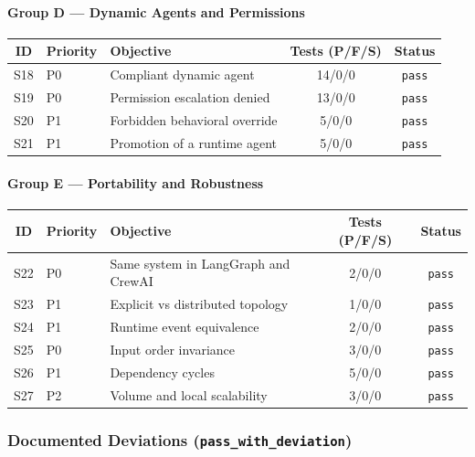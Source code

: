 \documentclass[10pt]{article}
\newcommand{\statuspass}{\textcolor{passgreen}{\texttt{pass}}}
\begin{document}
\paragraph{Group D --- Dynamic Agents and Permissions}

\begin{table}[htbp]
	\centering
	\small
	\begin{tabular}{@{}clp{6.5cm}cc@{}}
		\toprule
		\textbf{ID} & \textbf{Priority} & \textbf{Objective} & \textbf{Tests (P/F/S)} & \textbf{Status} \\
		\midrule
		S18 & P0 & Compliant dynamic agent & 14/0/0 & \statuspass{} \\
		S19 & P0 & Permission escalation denied & 13/0/0 & \statuspass{} \\
		S20 & P1 & Forbidden behavioral override & 5/0/0 & \statuspass{} \\
		S21 & P1 & Promotion of a runtime agent & 5/0/0 & \statuspass{} \\
		\bottomrule
	\end{tabular}
\end{table}

\paragraph{Group E --- Portability and Robustness}

\begin{table}[htbp]
	\centering
	\small
	\begin{tabular}{@{}clp{6.5cm}cc@{}}
		\toprule
		\textbf{ID} & \textbf{Priority} & \textbf{Objective} & \textbf{Tests (P/F/S)} & \textbf{Status} \\
		\midrule
		S22 & P0 & Same system in LangGraph and CrewAI & 2/0/0 & \statuspass{} \\
		S23 & P1 & Explicit vs distributed topology & 1/0/0 & \statuspass{} \\
		S24 & P1 & Runtime event equivalence & 2/0/0 & \statuspass{} \\
		S25 & P0 & Input order invariance & 3/0/0 & \statuspass{} \\
		S26 & P1 & Dependency cycles & 5/0/0 & \statuspass{} \\
		S27 & P2 & Volume and local scalability & 3/0/0 & \statuspass{} \\
		\bottomrule
	\end{tabular}
\end{table}

\subsubsection{Documented Deviations (\texttt{pass\_with\_deviation})}
\end{document}
